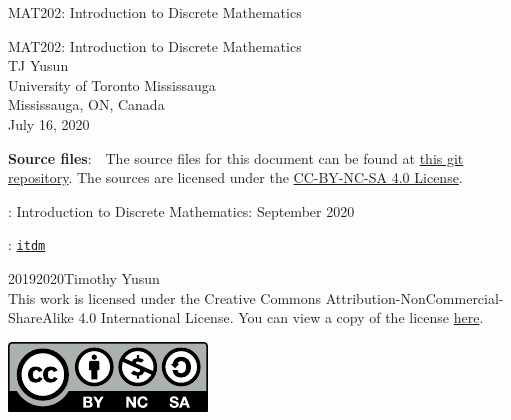 \documentclass[oneside,10pt,]{book}
\newcommand{\titlepagefont}{\relax}
\newcommand{\mono}[1]{\texttt{#1}}
\numberwithin{equation}{section}
\begin{document}
\frontmatter
\thispagestyle{empty}
{\titlepagefont\centering
\vspace*{0.28\textheight}
{\Huge MAT202: Introduction to Discrete Mathematics}\\}
\clearpage
\thispagestyle{empty}
\null%
\clearpage
\thispagestyle{empty}
{\titlepagefont\centering
\vspace*{0.14\textheight}
{\Huge MAT202: Introduction to Discrete Mathematics}\\[3\baselineskip]
{\Large TJ Yusun}\\[0.5\baselineskip]
{\Large University of Toronto Mississauga\\
Mississauga, ON, Canada}\\[3\baselineskip]
{\Large July 16, 2020}\\}
\clearpage
\thispagestyle{empty}
\hypertarget{x:colophon:colophon}{}
\par\noindent
\textbf{Source files}:\ \ The source files for this document can be found at \href{http://github.com/}{this git repository}. The sources are licensed under the \href{http://creativecommons.org/licenses/by-nc-sa/4.0/}{CC-BY-NC-SA 4.0 License}.
\par{}
: Introduction to Discrete Mathematics: September 2020\par\medskip
{}: \href{https:\slash{}\slash{}tjyusun.com\slash{}}{\mono{itdm}}\par\medskip
\noindent\textcopyright{}2019\textendash{}2020\quad{}Timothy Yusun\\[0.5\baselineskip]
This work is licensed under the Creative Commons Attribution-NonCommercial-ShareAlike 4.0 International License. You can view a copy of the license \href{http://creativecommons.org/licenses/by-nc-sa/4.0/}{here}. \begin{image}{0.375}{0.25}{0.375}%
\includegraphics[width=\linewidth]{figs/by-nc-sa}
\end{image}%
\end{document}

